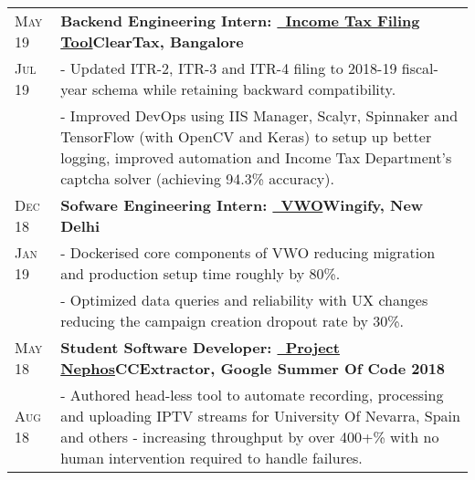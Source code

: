 \documentclass[a4paper,10pt]{extarticle} %
\begin{document}
\begin{tabularx}{\linewidth}{ l | X }
\textsc{May 19} & \textbf{Backend Engineering Intern: {\href{https://cleartax.in/income-tax-efiling}{\ Income Tax Filing Tool}}}\hfill\textbf{ClearTax, Bangalore}\\
\textsc{Jul 19}& {- Updated ITR-2, ITR-3 and ITR-4 filing to 2018-19 fiscal-year schema while retaining backward compatibility.}\\
& {- Improved DevOps using IIS Manager, Scalyr, Spinnaker and TensorFlow (with OpenCV and Keras) to setup up better logging, improved automation and Income Tax Department's captcha solver (achieving 94.3\% accuracy).}\\[2mm]

\textsc{Dec 18} & \textbf{Sofware Engineering Intern: {\href{https://vwo.com/}{\ VWO}}}\hfill\textbf{Wingify, New Delhi}\\
\textsc{Jan 19}& {- Dockerised core components of VWO reducing migration and production setup time roughly by 80\%.}\\
& {- Optimized data queries and reliability with UX changes reducing the campaign creation dropout rate by 30\%.}\\[2mm]

\textsc{May 18} & \textbf{Student Software Developer: {\href{https://github.com/thealphadollar/Nephos}{\ Project Nephos}}}\hfill\textbf{CCExtractor, Google Summer Of Code 2018}\\
\textsc{Aug 18}& {- Authored head-less tool to automate recording, processing and uploading IPTV streams for University Of Nevarra, Spain and others - increasing throughput by over 400+\% with no human intervention required to handle failures.}\\

\end{tabularx}

\vspace{-0.3cm}
\end{document}
